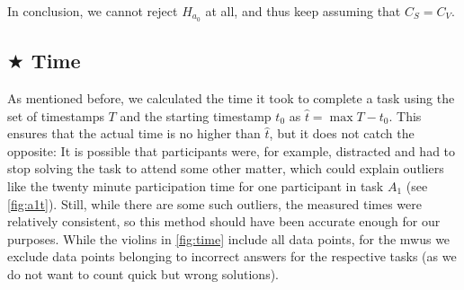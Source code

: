 \documentclass[../thesis]{subfiles}
\begin{document}
In conclusion, we cannot reject $H_{a_0}$ at all, and thus keep assuming that $C_S = C_V$.

\subsection[Time]{$\bigstar$ Time}\label{subsec:time}
As mentioned before, we calculated the time it took to complete a task using the set of timestamps $T$ and the starting timestamp $t_0$ as $\hat{t} = \max T - t_0$.
This ensures that the actual time is no higher than $\hat{t}$, but it does not catch the opposite:
It is possible that participants were, for example, distracted and had to stop solving the task to attend some other matter, which could explain outliers like the twenty minute participation time for one participant in task $A_1$ (see \cref{fig:a1t}).
Still, while there are some such outliers, the measured times were relatively consistent, so this method should have been accurate enough for our purposes.
While the \glspl{violin} in \cref{fig:time} include all data points, for the \glspl{mwu} we exclude data points belonging to incorrect answers for the respective tasks (as we do not want to count quick but wrong solutions).
\end{document}
